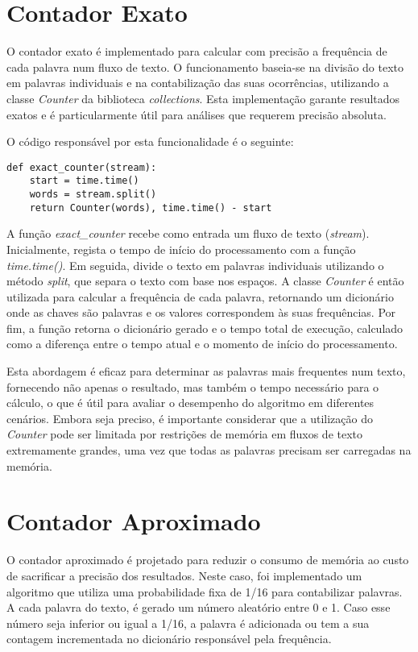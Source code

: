 \documentclass[shortpaper, portugues, times, mirror]{revdetua}
\begin{document}
\section{Contador Exato}
O contador exato é implementado para calcular com precisão a frequência de cada palavra num fluxo de texto. O funcionamento baseia-se na divisão do texto em palavras individuais e na contabilização das suas ocorrências, utilizando a classe \textit{Counter} da biblioteca \textit{collections}. Esta implementação garante resultados exatos e é particularmente útil para análises que requerem precisão absoluta.

O código responsável por esta funcionalidade é o seguinte:
\begin{lstlisting}
def exact_counter(stream):
    start = time.time()
    words = stream.split()
    return Counter(words), time.time() - start
\end{lstlisting}
A função \textit{exact\_counter} recebe como entrada um fluxo de texto (\textit{stream}). Inicialmente, regista o tempo de início do processamento com a função \textit{time.time()}. Em seguida, divide o texto em palavras individuais utilizando o método \textit{split}, que separa o texto com base nos espaços. A classe \textit{Counter} é então utilizada para calcular a frequência de cada palavra, retornando um dicionário onde as chaves são palavras e os valores correspondem às suas frequências. Por fim, a função retorna o dicionário gerado e o tempo total de execução, calculado como a diferença entre o tempo atual e o momento de início do processamento.

Esta abordagem é eficaz para determinar as palavras mais frequentes num texto, fornecendo não apenas o resultado, mas também o tempo necessário para o cálculo, o que é útil para avaliar o desempenho do algoritmo em diferentes cenários. Embora seja preciso, é importante considerar que a utilização do \textit{Counter} pode ser limitada por restrições de memória em fluxos de texto extremamente grandes, uma vez que todas as palavras precisam ser carregadas na memória.

\section{Contador Aproximado}
O contador aproximado é projetado para reduzir o consumo de memória ao custo de sacrificar a precisão dos resultados. Neste caso, foi implementado um algoritmo que utiliza uma probabilidade fixa de 1/16 para contabilizar palavras. A cada palavra do texto, é gerado um número aleatório entre 0 e 1. Caso esse número seja inferior ou igual a 1/16, a palavra é adicionada ou tem a sua contagem incrementada no dicionário responsável pela frequência.
\end{document}
